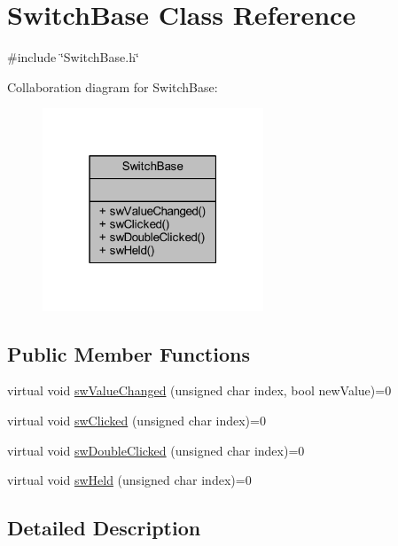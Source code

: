 \hypertarget{class_switch_base}{}\section{Switch\+Base Class Reference}
\label{class_switch_base}


{\ttfamily \#include \char`\"{}Switch\+Base.\+h\char`\"{}}



Collaboration diagram for Switch\+Base\+:
\nopagebreak
\begin{figure}[H]
\begin{center}
\leavevmode
\includegraphics[width=187pt]{de/dbc/class_switch_base__coll__graph}
\end{center}
\end{figure}
\subsection*{Public Member Functions}
\begin{DoxyCompactItemize}
\item 
virtual void \hyperlink{class_switch_base_a8dce83329bd9ce69e55d2f01115f3593}{sw\+Value\+Changed} (unsigned char index, bool new\+Value)=0
\item 
virtual void \hyperlink{class_switch_base_aa351081e25dc6a74959c1ec49f972fb5}{sw\+Clicked} (unsigned char index)=0
\item 
virtual void \hyperlink{class_switch_base_a120bac96086b295783809866e3afd390}{sw\+Double\+Clicked} (unsigned char index)=0
\item 
virtual void \hyperlink{class_switch_base_a074fca26f56e9253ddd86720f7840440}{sw\+Held} (unsigned char index)=0
\end{DoxyCompactItemize}


\subsection{Detailed Description}


